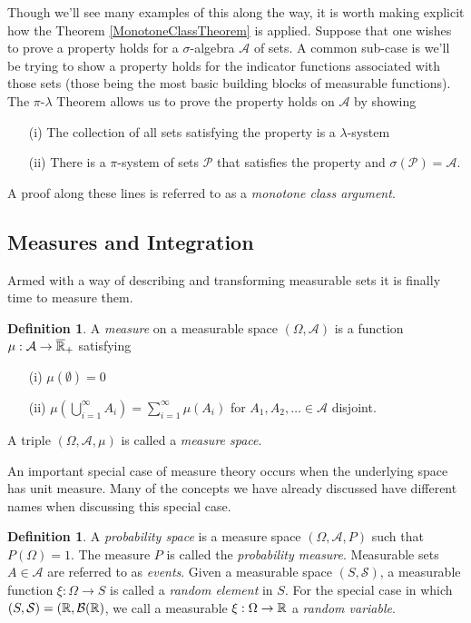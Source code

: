 \documentclass{amsart}
\theoremstyle{remark}
\theoremstyle{definition}
\newtheorem{defn}[thm]{Definition}
\begin{document}
Though we'll see many examples of this along the way, it is worth
making explicit how the Theorem \ref{MonotoneClassTheorem} is applied.
Suppose that one wishes to prove a property holds for a
$\sigma$-algebra $\mathcal{A}$ of sets.  A common sub-case is we'll be trying to show a
property holds for the indicator functions associated with those sets
(those being the most basic building blocks of measurable functions).
The $\pi$-$\lambda$ Theorem allows us to prove the property holds on
$\mathcal{A}$ by showing 
\begin{itemize}
\item[(i)] The collection of all sets satisfying the property is a $\lambda$-system
\item[(ii)] There is a $\pi$-system of sets $\mathcal{P}$ that
  satisfies the property and $\sigma(\mathcal{P}) = \mathcal{A}$.
\end{itemize}
A proof along these lines is referred to as a \emph{monotone class
  argument}.

\subsection{Measures and Integration}
Armed with a way of describing and transforming measurable sets it is
finally time to measure them.
\begin{defn}A \emph{measure} on a measurable space $(\Omega,
  \mathcal{A})$ is a function $\mu : \mathcal{A} \to
  \overline{\mathbb{R}}_+$ satisfying
\begin{itemize}
\item[(i)] $\mu(\emptyset) = 0$
\item[(ii)] $\mu(\bigcup_{i=1}^\infty A_i) = \sum_{i=1}^\infty \mu(A_i)$
  for $A_1, A_2, \dots \in \mathcal{A}$ disjoint.
\end{itemize}
A triple $(\Omega, \mathcal{A}, \mu)$ is called a \emph{measure space}.
\end{defn}

An important special case of measure theory occurs when the underlying
space has unit measure.  Many of the concepts we have already
discussed have different names when discussing this special case.
\begin{defn}A \emph{probability space} is a measure space $(\Omega,
  \mathcal{A}, P)$ such that $P(\Omega) = 1$.  The measure $P$ is
  called the \emph{probability measure}.  Measurable sets $A \in
  \mathcal{A}$ are referred to as \emph{events}.  Given a measurable
  space $(S, \mathcal{S})$, a measurable function $\xi : \Omega \to S$
  is called a \emph{random element} in $S$.  For the special case in
  which $(S, \mathcal{S}) = (\mathbb{R}, \mathcal{B}(\mathbb{R})$, we call a
  measurable $\xi : \Omega \to \mathbb{R}$ a \emph{random variable}.
\end{defn}
\end{document}
